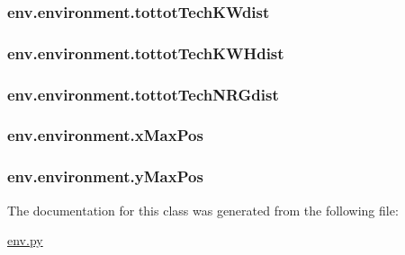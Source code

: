 \hypertarget{classenv_1_1environment_ac02f673cd36acf5bb1140876d3419c79}{
\subsubsection[{tottot\-Tech\-K\-Wdist}]{\setlength{\rightskip}{0pt plus 5cm}env.\-environment.\-tottot\-Tech\-K\-Wdist}}\label{classenv_1_1environment_ac02f673cd36acf5bb1140876d3419c79}
\hypertarget{classenv_1_1environment_a344b4f7310a3ad69f3ac8746de3d33f5}{
\subsubsection[{tottot\-Tech\-K\-W\-Hdist}]{\setlength{\rightskip}{0pt plus 5cm}env.\-environment.\-tottot\-Tech\-K\-W\-Hdist}}\label{classenv_1_1environment_a344b4f7310a3ad69f3ac8746de3d33f5}
\hypertarget{classenv_1_1environment_ac75c84484643ef44af6674af85da8930}{
\subsubsection[{tottot\-Tech\-N\-R\-Gdist}]{\setlength{\rightskip}{0pt plus 5cm}env.\-environment.\-tottot\-Tech\-N\-R\-Gdist}}\label{classenv_1_1environment_ac75c84484643ef44af6674af85da8930}
\hypertarget{classenv_1_1environment_a030668a5d974b79164862799ccddbff3}{
\subsubsection[{x\-Max\-Pos}]{\setlength{\rightskip}{0pt plus 5cm}env.\-environment.\-x\-Max\-Pos}}\label{classenv_1_1environment_a030668a5d974b79164862799ccddbff3}
\hypertarget{classenv_1_1environment_a1036c17b8afe9d1d7650bc781c9b7416}{
\subsubsection[{y\-Max\-Pos}]{\setlength{\rightskip}{0pt plus 5cm}env.\-environment.\-y\-Max\-Pos}}\label{classenv_1_1environment_a1036c17b8afe9d1d7650bc781c9b7416}


The documentation for this class was generated from the following file\-:\begin{DoxyCompactItemize}
\item 
\hyperlink{env_8py}{env.\-py}\end{DoxyCompactItemize}
